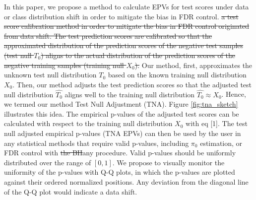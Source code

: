 \documentclass{article}
\newcommand{\correction}[2]{{\color{red}\sout{#1}}{\color{red}#2}}
\newcommand{\edit}[1]{{\color{red}#1}}
\begin{document}
In this paper, \edit{we propose a method to calculate EPVs for test scores under data or class distribution shift in order to mitigate the bias in FDR control.} \correction{ a test score calibration method in order to mitigate the bias in FDR control originated from data shift. The test prediction scores are calibrated so that the approximated distribution of the prediction scores of the negative test samples (test null $T_0$) aligns to the actual distribution of the prediction scores of the negative training samples (training null $X_0$).}{} \edit{Our method, first, approximates the unknown test null distribution $T_0$ based on the known training null distribution $X_0$. Then, our method adjusts the test prediction scores so that the adjusted test null distribution $\hat{T_0}$ aligns well to the training null distribution $\hat{T_0}\approx X_0$}. Hence, we termed our method Test Null Adjustment (TNA). Figure \ref{fig:tna_sketch} illustrates this idea.  The empirical p-values of the adjusted test scores can be calculated with respect to the training null distribution $X_0$ with eq [1]. The test null adjusted empirical p-values (TNA EPVs) can then be used \edit{ by the user in any statistical methods that require valid p-values, including $\pi_0$ estimation, or } FDR control with \correction{the BH}{any} procedure. Valid p-values should be uniformly distributed over the range of $[0,1]$.  We propose to visually monitor the uniformity of the p-values with Q-Q plots, in which the p-values are plotted against their ordered normalized positions. Any deviation from the diagonal line of the Q-Q plot would indicate a data shift.
\end{document}
